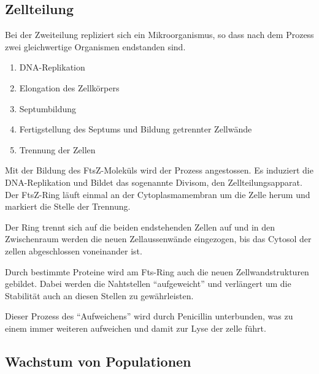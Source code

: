 \subsection{Zellteilung}

Bei der Zweiteilung repliziert sich ein Mikroorganismus,
so dass nach dem Prozess zwei gleichwertige Organismen endstanden sind.

\begin{enumerate}
	\item DNA-Replikation
	\item Elongation des Zellkörpers
	\item Septumbildung
	\item Fertigstellung des Septums und Bildung getrennter Zellwände
	\item Trennung der Zellen
\end{enumerate}

Mit der Bildung des FtsZ-Moleküls wird der Prozess angestossen.
Es induziert die DNA-Replikation und Bildet das sogenannte Divisom,
den Zellteilungsapparat.
Der FtsZ-Ring läuft einmal an der Cytoplasmamembran um die Zelle herum und
markiert die Stelle der Trennung.

Der Ring trennt sich auf die beiden endstehenden Zellen auf und
in den Zwischenraum werden die neuen Zellaussenwände eingezogen,
bis das Cytosol der zellen abgeschlossen voneinander ist.

Durch bestimmte Proteine wird am Fts-Ring auch die neuen Zellwandstrukturen gebildet.
Dabei werden die Nahtstellen ``aufgeweicht'' und
verlängert um die Stabilität auch an diesen Stellen zu gewährleisten.

Dieser Prozess des ``Aufweichens'' wird durch Penicillin unterbunden,
was zu einem immer weiteren aufweichen und
damit zur Lyse der zelle führt.

\subsection{Wachstum von Populationen}

